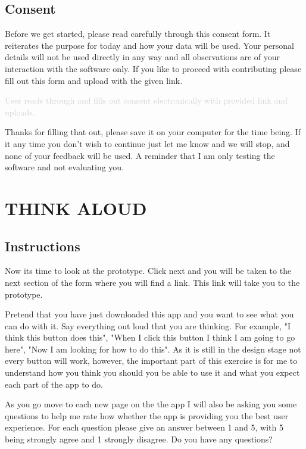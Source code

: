 \documentclass[a4 paper, 10pt]{article}
\begin{document}
    \subsection*{Consent}
        \begin{itshape}
            Before we get started, please read carefully through this consent form. It reiterates the purpose for today and how your data will be used. Your personal details will not be used directly in any way and all observations are of your interaction with the software only. If you like to proceed with contributing please fill out this form and upload with the given link.
        \end{itshape}

        \textcolor{lightgray}
            {User reads through and fills out consent electronically with provided link and uploads.}
        
        \begin{itshape}
            Thanks for filling that out, please save it on your computer for the time being. If it any time you don’t wish to continue just let me know and we will stop, and none of your feedback will be used. A reminder that I am only testing the software and not evaluating you.
        \end{itshape}

\section*{THINK ALOUD}
    \subsection*{Instructions}
    Now its time to look at the prototype. Click next and you will be taken to the next section of the form where you will find a link. This link will take you to the prototype. 

    Pretend that you have just downloaded this app and you want to see what you can do with it. Say everything out loud that you are thinking. For example, "I think this button does this", "When I click this button I think I am going to go here", "Now I am looking for how to do this". As it is still in the design stage not every button will work, however, the important part of this exercise is for me to understand how you think you should you be able to use it and what you expect each part of the app to do.

    As you go move to each new page on the the app I will also be asking you some questions to help me rate how whether the app is providing you the best user experience. For each question please give an answer between 1 and 5, with 5 being strongly agree and 1 strongly disagree. Do you have any questions? 
\end{document}
